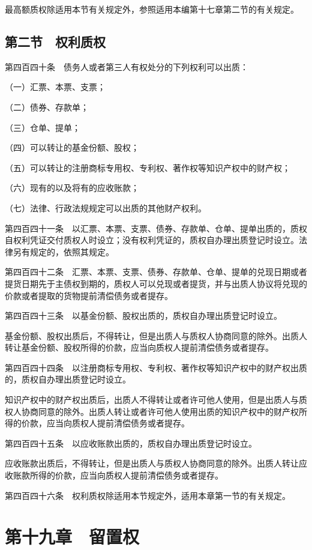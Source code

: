 \documentclass[UTF8,12pt,a4paper]{ctexbook}
\begin{document}
最高额质权除适用本节有关规定外，参照适用本编第十七章第二节的有关规定。

\subsection*{第二节　权利质权}

第四百四十条　债务人或者第三人有权处分的下列权利可以出质：

（一）汇票、本票、支票；

（二）债券、存款单；

（三）仓单、提单；

（四）可以转让的基金份额、股权；

（五）可以转让的注册商标专用权、专利权、著作权等知识产权中的财产权；

（六）现有的以及将有的应收账款；

（七）法律、行政法规规定可以出质的其他财产权利。

第四百四十一条　以汇票、本票、支票、债券、存款单、仓单、提单出质的，质权自权利凭证交付质权人时设立；没有权利凭证的，质权自办理出质登记时设立。法律另有规定的，依照其规定。

第四百四十二条　汇票、本票、支票、债券、存款单、仓单、提单的兑现日期或者提货日期先于主债权到期的，质权人可以兑现或者提货，并与出质人协议将兑现的价款或者提取的货物提前清偿债务或者提存。

第四百四十三条　以基金份额、股权出质的，质权自办理出质登记时设立。

基金份额、股权出质后，不得转让，但是出质人与质权人协商同意的除外。出质人转让基金份额、股权所得的价款，应当向质权人提前清偿债务或者提存。

第四百四十四条　以注册商标专用权、专利权、著作权等知识产权中的财产权出质的，质权自办理出质登记时设立。

知识产权中的财产权出质后，出质人不得转让或者许可他人使用，但是出质人与质权人协商同意的除外。出质人转让或者许可他人使用出质的知识产权中的财产权所得的价款，应当向质权人提前清偿债务或者提存。

第四百四十五条　以应收账款出质的，质权自办理出质登记时设立。

应收账款出质后，不得转让，但是出质人与质权人协商同意的除外。出质人转让应收账款所得的价款，应当向质权人提前清偿债务或者提存。

第四百四十六条　权利质权除适用本节规定外，适用本章第一节的有关规定。

\section*{第十九章　留置权}
\end{document}
